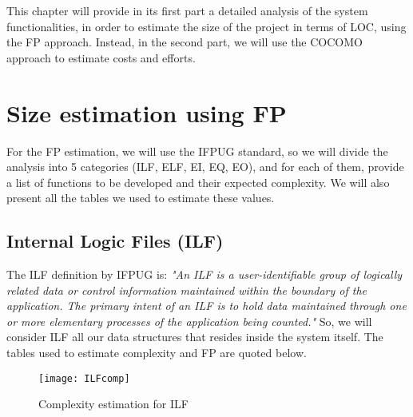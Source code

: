 This chapter will provide in its first part a detailed analysis of the system functionalities, in order to estimate the size of the project in terms of LOC, using the FP approach. Instead, in the second part, we will use the COCOMO approach to estimate costs and efforts.
\section{Size estimation using FP}
For the FP estimation, we will use the IFPUG standard, so we will divide the analysis into 5 categories (ILF, ELF, EI, EQ, EO), and for each of them, provide a list of functions to be developed and their expected complexity. We will also present all the tables we used to estimate these values.

\subsection{Internal Logic Files (ILF)}
The ILF definition by IFPUG is: \bigbreak
\textit{"An ILF is a user-identifiable group of logically related data or control information maintained within the boundary of the application. The primary intent of an ILF is to hold data maintained through one or more elementary processes of the application being counted."} \bigbreak
So, we will consider ILF all our data structures that resides inside the system itself. The tables used to estimate complexity and FP are quoted below.

\begin{figure}
  \centering
  \texttt{[image: ILFcomp]}
  \caption{Complexity estimation for ILF}
\end{figure}

